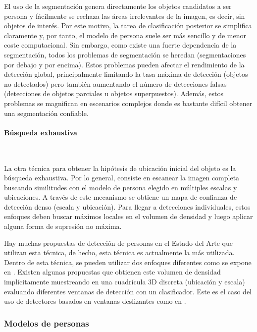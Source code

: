 El uso de la segmentación genera directamente los objetos candidatos a ser persona y fácilmente se rechaza las áreas irrelevantes de la imagen, es decir, sin objetos de interés. Por este motivo, la tarea de clasificación posterior se simplifica claramente y, por tanto, el modelo de persona suele ser más sencillo y de menor coste computacional. Sin embargo, como existe una fuerte dependencia de la segmentación, todos los problemas de segmentación se heredan (segmentaciones por debajo y por encima). Estos problemas pueden afectar el rendimiento de la detección global, principalmente limitando la tasa máxima de detección (objetos no detectados) pero también aumentando el número de detecciones falsas (detecciones de objetos parciales u objetos superpuestos). Además, estos problemas se magnifican en escenarios complejos donde es bastante difícil obtener una segmentación confiable.

\paragraph*{Búsqueda exhaustiva}\mbox{} \\
\label{parag:deteccion-objetos-personas-busqueda-exhaustiva}

La otra técnica para obtener la hipótesis de ubicación inicial del objeto es la búsqueda exhaustiva. Por lo general, consiste en escanear la imagen completa buscando similitudes con el modelo de persona elegido en múltiples escalas y ubicaciones. A través de este mecanismo se obtiene un mapa de confianza de detección denso (escala y ubicación). Para llegar a detecciones individuales, estos enfoques deben buscar máximos locales en el volumen de densidad y luego aplicar alguna forma de supresión no máxima.

Hay muchas propuestas de detección de personas en el Estado del Arte que utilizan esta técnica, de hecho, esta técnica es actualmente la más utilizada. Dentro de esta técnica, se pueden utilizar dos enfoques diferentes como se expone en \cite{5674059}. Existen algunas propuestas que obtienen este volumen de densidad implícitamente muestreando en una cuadrícula 3D discreta (ubicación y escala) evaluando diferentes ventanas de detección con un clasificador. Este es el caso del uso de detectores basados en ventanas deslizantes como en \cite{4409057}.

\subsubsection*{Modelos de personas}
\label{subsubsec:modelos-personas-deteccion-personas-objetos}

